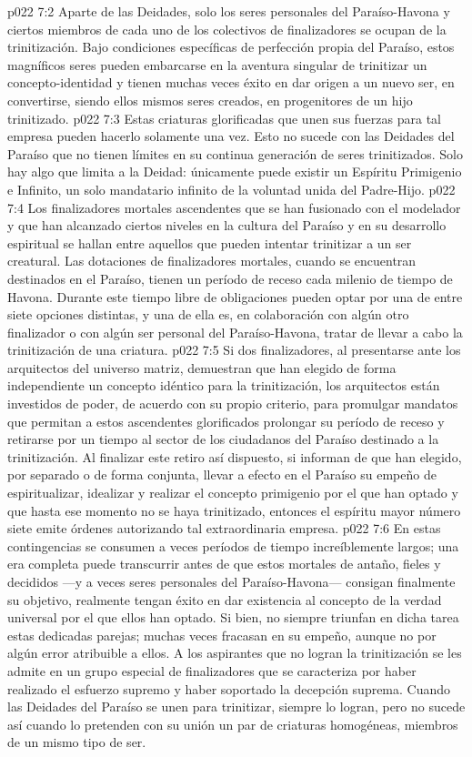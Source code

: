 \vs p022 7:2 Aparte de las Deidades, solo los seres personales del Paraíso\hyp{}Havona y ciertos miembros de cada uno de los colectivos de finalizadores se ocupan de la trinitización. Bajo condiciones específicas de perfección propia del Paraíso, estos magníficos seres pueden embarcarse en la aventura singular de trinitizar un concepto\hyp{}identidad y tienen muchas veces éxito en dar origen a un nuevo ser, en convertirse, siendo ellos mismos seres creados, en progenitores de un hijo trinitizado.
\vs p022 7:3 Estas criaturas glorificadas que unen sus fuerzas para tal empresa pueden hacerlo solamente una vez. Esto no sucede con las Deidades del Paraíso que no tienen límites en su continua generación de seres trinitizados. Solo hay algo que limita a la Deidad: únicamente puede existir un Espíritu Primigenio e Infinito, un solo mandatario infinito de la voluntad unida del Padre\hyp{}Hijo.
\vs p022 7:4 Los finalizadores mortales ascendentes que se han fusionado con el modelador y que han alcanzado ciertos niveles en la cultura del Paraíso y en su desarrollo espiritual se hallan entre aquellos que pueden intentar trinitizar a un ser creatural. Las dotaciones de finalizadores mortales, cuando se encuentran destinados en el Paraíso, tienen un período de receso cada milenio de tiempo de Havona. Durante este tiempo libre de obligaciones pueden optar por una de entre siete opciones distintas, y una de ella es, en colaboración con algún otro finalizador o con algún ser personal del Paraíso\hyp{}Havona, tratar de llevar a cabo la trinitización de una criatura.
\vs p022 7:5 Si dos finalizadores, al presentarse ante los arquitectos del universo matriz, demuestran que han elegido de forma independiente un concepto idéntico para la trinitización, los arquitectos están investidos de poder, de acuerdo con su propio criterio, para promulgar mandatos que permitan a estos ascendentes glorificados prolongar su período de receso y retirarse por un tiempo al sector de los ciudadanos del Paraíso destinado a la trinitización. Al finalizar este retiro así dispuesto, si informan de que han elegido, por separado o de forma conjunta, llevar a efecto en el Paraíso su empeño de espiritualizar, idealizar y realizar el concepto primigenio por el que han optado y que hasta ese momento no se haya trinitizado, entonces el espíritu mayor número siete emite órdenes autorizando tal extraordinaria empresa.
\vs p022 7:6 En estas contingencias se consumen a veces períodos de tiempo increíblemente largos; una era completa puede transcurrir antes de que estos mortales de antaño, fieles y decididos ---y a veces seres personales del Paraíso\hyp{}Havona--- consigan finalmente su objetivo, realmente tengan éxito en dar existencia al concepto de la verdad universal por el que ellos han optado. Si bien, no siempre triunfan en dicha tarea estas dedicadas parejas; muchas veces fracasan en su empeño, aunque no por algún error atribuible a ellos. A los aspirantes que no logran la trinitización se les admite en un grupo especial de finalizadores que se caracteriza por haber realizado el esfuerzo supremo y haber soportado la decepción suprema. Cuando las Deidades del Paraíso se unen para trinitizar, siempre lo logran, pero no sucede así cuando lo pretenden con su unión un par de criaturas homogéneas, miembros de un mismo tipo de ser.
